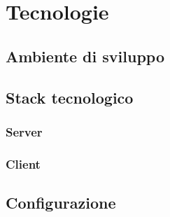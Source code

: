 \section{Tecnologie}
    \subsection{Ambiente di sviluppo}
    \subsection{Stack tecnologico}
        \subsubsection{Server}
        \subsubsection{Client}
    \subsection{Configurazione}


